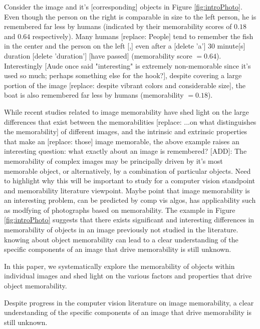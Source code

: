 Consider the image and it's [corresponding] objects in Figure \ref{fig:introPhoto}. Even though the person on the right is comparable in size to the left person, he is remembered far less by humans (indicated by their memorability scores of $0.18$ and $0.64$ respectively). Many humans [replace: People] tend to remember the fish in the center and the person on the left [,] even after a [delete 'a'] $30$ minute[s] duration [delete 'duration'] [have passed] (memorability score $= 0.64$). Interestingly [Aude once said "interesting" is extremely non-memorable since it's used so much; perhaps something else for the hook?], despite covering a large portion of the image [replace: despite vibrant colors and considerable size], the boat is also remembered far less by humans (memorability $= 0.18$).

While recent studies related to image memorability have shed light on the large differences that exist between the memorabilities [replace: ...on what distinguishes the memorability] of different images, and the intrinsic and extrinsic properties that make an [replace: those] image memorable, the above example raises an interesting question: what exactly about an image is remembered? [ADD]: The memorability of complex images may be principally driven by it's most memorable object, or alternatively, by a combination of particular objects. Need to highlight why this will be important to study for a computer vision standpoint and memorability literature viewpoint. Maybe point that image memorability is an interesting problem, can be predicted by comp vis algos, has applicability such as modfying of photographs based on memorability. The example in Figure \ref{fig:introPhoto} suggests that there exists significant and interesting differences in memorability of objects in an image previously not studied in the literature. knowing about object memorability can lead to a clear understanding of the specific components of an image that drive memorability is still unknown.







In this paper, we systematically explore the memorability of objects within individual images and shed light on the various factors and properties that drive object memorability.


Despite progress in the computer vision literature on image memorability, a clear understanding of the specific components of an image that drive memorability is still unknown.


